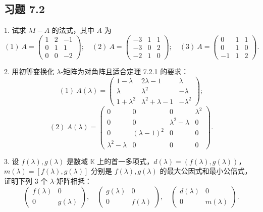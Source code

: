 \documentclass[UTF8, 12pt, fontset=fandol, oneside]{ctexart}
\begin{document}
\subsection*{习题 7.2}

1. 试求 $\lambda I-A$ 的法式，其中 $A$ 为
\[
(1)\ A=\left(\begin{array}{ccc}
1 & 2 & -1\\
0 & 1 & 1\\
0 & 0 & -2
\end{array}\right);\quad
(2)\ A=\left(\begin{array}{ccc}
-3 & 1 & 1\\
-3 & 0 & 2\\
-2 & 1 & 0
\end{array}\right);\quad
(3)\ A=\left(\begin{array}{ccc}
0 & 1 & 1\\
0 & 1 & 0\\
-1 & 1 & 2
\end{array}\right).
\]

2. 用初等变换化 $\lambda$-矩阵为对角阵且适合定理 7.2.1 的要求：
\[
(1)\ A(\lambda)=\left(\begin{array}{ccc}
1-\lambda & 2\lambda-1 & \lambda\\
\lambda & \lambda^2 & -\lambda\\
1+\lambda^2 & \lambda^2+\lambda-1 & -\lambda^2
\end{array}\right);
\]
\[
(2)\ A(\lambda)=\left(\begin{array}{cccc}
0 & 0 & 0 & \lambda^2\\
0 & 0 & \lambda^2-\lambda & 0\\
0 & (\lambda-1)^2 & 0 & 0\\
\lambda^2-\lambda & 0 & 0 & 0
\end{array}\right).
\]

3. 设 $f(\lambda),g(\lambda)$ 是数域 $\mathbb{K}$ 上的首一多项式，$d(\lambda)=(f(\lambda),g(\lambda))$，$m(\lambda)=[f(\lambda),g(\lambda)]$ 分别是 $f(\lambda),g(\lambda)$ 的最大公因式和最小公倍式，证明下列 3 个 $\lambda$-矩阵相抵：
\[
\left(\begin{array}{cc}
f(\lambda) & 0\\
0 & g(\lambda)
\end{array}\right),\quad
\left(\begin{array}{cc}
g(\lambda) & 0\\
0 & f(\lambda)
\end{array}\right),\quad
\left(\begin{array}{cc}
d(\lambda) & 0\\
0 & m(\lambda)
\end{array}\right).
\]
\end{document}
